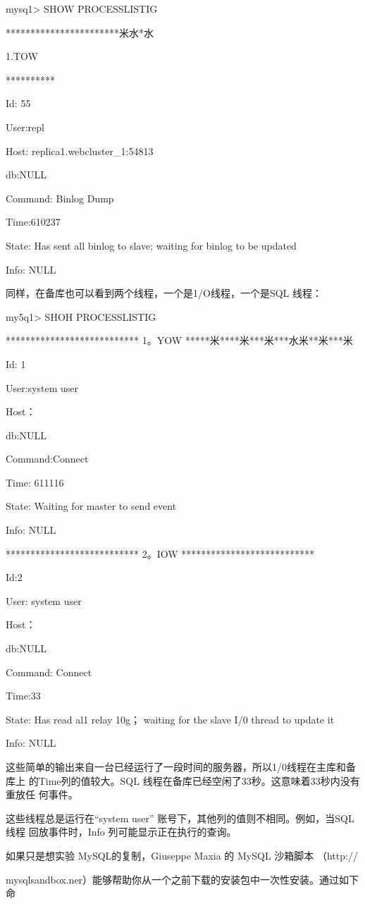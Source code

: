 mysq1> SHOW PROCESSLISTIG

***********************米水*水

1.TOW

**********

Id: 55

User:repl

Host: replica1.webcluster\_1:54813

db:NULL

Command: Binlog Dump

Time:610237

State: Has sent all binlog to slave; waiting for binlog to be updated

Info: NULL

同样，在备库也可以看到两个线程，一个是1/O线程，一个是SQL 线程：

my5q1> SHOH PROCESSLISTIG

*************************** 1。YOW *****米****米***米***水米**米***米

Id: 1

User:system user

Host：

db:NULL

Command:Connect

Time: 611116

State: Waiting for master to send event

Info: NULL

*************************** 2。IOW ***************************

Id:2

User: system user

Host：

db:NULL

Command: Connect

Time:33

State: Has read al1 relay 10g； waiting for the slave I/0 thread to update it

Info: NULL

这些简单的输出来自一台已经运行了一段时间的服务器，所以1/0线程在主库和备库上
的Time列的值较大。SQL 线程在备库已经空闲了33秒。这意味着33秒内没有重放任
何事件。

这些线程总是运行在“system user” 账号下，其他列的值则不相同。例如，当SQL线程
回放事件时，Info 列可能显示正在执行的查询。

如果只是想实验 MySQL的复制，Giuseppe Maxia 的 MySQL 沙箱脚本 （http://

mysqlsandbox.ner）能够帮助你从一个之前下载的安装包中一次性安装。通过如下命

